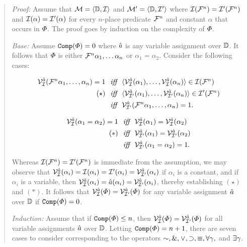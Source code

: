 \begin{quote} 
  \textit{Proof:} Assume that $\mathcal{M}=\langle\mathbb{D},\mathcal{I}\rangle$ and $\mathcal{M}'=\langle\mathbb{D},\mathcal{I}'\rangle$ where $\mathcal{I}(\mathcal{F}^n)=\mathcal{I}'(\mathcal{F}^n)$ and $\mathcal{I}(\alpha)=\mathcal{I}'(\alpha)$ for every $n$-place predicate $\mathcal{F}^n$ and constant $\alpha$ that occurs in $\varPhi$.
  The proof goes by induction on the complexity of $\varPhi$.

  \textit{Base:} Assume $\texttt{Comp}(\varPhi)=0$ where $\hat{a}$ is any variable assignment over $\mathbb{D}$.
  It follows that $\varPhi$ is either $\mathcal{F}^n\alpha_1,\ldots\alpha_n$ or $\alpha_1=\alpha_2$.
  Consider the following cases:

  \vspace{-.2in}
  \begin{align*}
    \mathcal{V}_{\mathcal{I}}^{\hat{a}}(\mathcal{F}^n\alpha_1,\ldots,\alpha_n)=1 &\textit{ ~iff~ } \langle\mathcal{V}_{\mathcal{I}}^{\hat{a}}(\alpha_1),\ldots,\mathcal{V}_{\mathcal{I}}^{\hat{a}}(\alpha_n)\rangle\in\mathcal{I}(\mathcal{F}^n)\\
      (\star) &\textit{ ~iff~ } \langle\mathcal{V}_{\mathcal{I}'}^{\hat{a}}(\alpha_1),\ldots,\mathcal{V}_{\mathcal{I}'}^{\hat{a}}(\alpha_n)\rangle\in\mathcal{I}'(\mathcal{F}^n)\\
      &\textit{ ~iff~ } \mathcal{V}_{\mathcal{I}'}^{\hat{a}}(\mathcal{F}^n\alpha_1,\ldots,\alpha_n)=1.
  \end{align*}

  \vspace{-.2in}
  \begin{align*}
    \mathcal{V}_{\mathcal{I}}^{\hat{a}}(\alpha_1=\alpha_2)=1 &\textit{ ~iff~ } \mathcal{V}_{\mathcal{I}}^{\hat{a}}(\alpha_1) = \mathcal{V}_{\mathcal{I}}^{\hat{a}}(\alpha_2)\\
      (\ast) &\textit{ ~iff~ } \mathcal{V}_{\mathcal{I}'}^{\hat{a}}(\alpha_1) = \mathcal{V}_{\mathcal{I}'}^{\hat{a}}(\alpha_2)\\
      &\textit{ ~iff~ } \mathcal{V}_{\mathcal{I}'}^{\hat{a}}(\alpha_1=\alpha_2)=1.
  \end{align*}

  Whereas $\mathcal{I}(\mathcal{F}^n)=\mathcal{I}'(\mathcal{F}^n)$ is immediate from the assumption, we may observe that $\mathcal{V}_{\mathcal{I}}^{\hat{a}}(\alpha_i)=\mathcal{I}(\alpha_i)=\mathcal{I}'(\alpha_i)=\mathcal{V}_{\mathcal{I}'}^{\hat{a}}(\alpha_i)$ if $\alpha_i$ is a constant, and if $\alpha_i$ is a variable, then $\mathcal{V}_{\mathcal{I}}^{\hat{a}}(\alpha_i)=\hat{a}(\alpha_i)=\mathcal{V}_{\mathcal{I}'}^{\hat{a}}(\alpha_i)$, thereby establishing $(\star)$ and $(\ast)$. 
  It follows that $\mathcal{V}_{\mathcal{I}}^{\hat{a}}(\varPhi)=\mathcal{V}_{\mathcal{I}'}^{\hat{a}}(\varPhi)$ for any variable assignment $\hat{a}$ over $\mathbb{D}$ if $\texttt{Comp}(\varPhi)=0$.

  \textit{Induction:} Assume that if $\texttt{Comp}(\varPhi)\leq n$, then $\mathcal{V}_{\mathcal{I}}^{\hat{a}}(\varPhi)=\mathcal{V}_{\mathcal{I}'}^{\hat{a}}(\varPhi)$ for all variable assignments $\hat{a}$ over $\mathbb{D}$. 
  Letting $\texttt{Comp}(\varPhi)=n+1$, there are seven cases to consider corresponding to the operators $\enot,\eand,\eor,\eif,\eiff,\qt{\forall}{\gamma},$ and $\exists \gamma$.


\end{quote}
